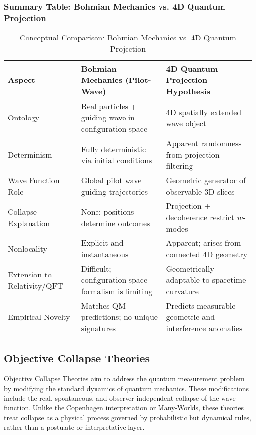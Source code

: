 \documentclass[12pt]{article}
\begin{document}
\subsubsection*{Summary Table: Bohmian Mechanics vs. 4D Quantum Projection}

\begin{table}[H]
\centering
\renewcommand{\arraystretch}{1.3}
\begin{tabular}{|p{4cm}|p{5cm}|p{5cm}|}
\hline
\textbf{Aspect} & \textbf{Bohmian Mechanics (Pilot-Wave)} & \textbf{4D Quantum Projection Hypothesis} \\
\hline
Ontology & Real particles + guiding wave in configuration space & 4D spatially extended wave object \\
\hline
Determinism & Fully deterministic via initial conditions & Apparent randomness from projection filtering \\
\hline
Wave Function Role & Global pilot wave guiding trajectories & Geometric generator of observable 3D slices \\
\hline
Collapse Explanation & None; positions determine outcomes & Projection + decoherence restrict \( w \)-modes \\
\hline
Nonlocality & Explicit and instantaneous & Apparent; arises from connected 4D geometry \\
\hline
Extension to Relativity/QFT & Difficult; configuration space formalism is limiting & Geometrically adaptable to spacetime curvature \\
\hline
Empirical Novelty & Matches QM predictions; no unique signatures & Predicts measurable geometric and interference anomalies \\
\hline
\end{tabular}
\caption{Conceptual Comparison: Bohmian Mechanics vs. 4D Quantum Projection}
\end{table}

\newpage

\subsection{Objective Collapse Theories}

Objective Collapse Theories aim to address the quantum measurement problem by modifying the standard dynamics of quantum mechanics. These modifications include the real, spontaneous, and observer-independent collapse of the wave function. Unlike the Copenhagen interpretation or Many-Worlds, these theories treat collapse as a physical process governed by probabilistic but dynamical rules, rather than a postulate or interpretative layer.
\end{document}
